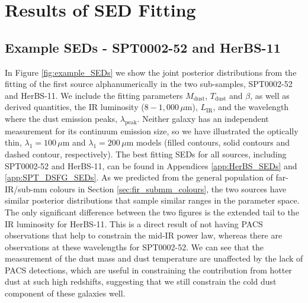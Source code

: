 \section{Results of SED Fitting}

\subsection{Example SEDs - SPT0002-52 and HerBS-11}

In Figure \ref{fig:example_SEDs} we show the joint posterior distributions from the fitting of the first source alphanumerically in the two sub-samples, SPT0002-52 and HerBS-11. We include the fitting parameters $M_{\textrm{dust}}$, $T_{\textrm{dust}}$ and $\beta$, as well as derived quantities, the IR luminosity ($8 - 1,000\,\mu$m), $L_\textrm{IR}$, and the wavelength where the dust emission peaks, $\lambda_\textrm{peak}$. Neither galaxy has an independent measurement for its continuum emission size, so we have illustrated the optically thin, $\lambda_1 = 100\,\mu$m and $\lambda_1 = 200\,\mu$m models (filled contours, solid contours and dashed contour, respectively). The best fitting SEDs for all sources, including SPT0002-52 and HerBS-11, can be found in Appendices \ref{app:HerBS_SEDs} and \ref{app:SPT_DSFG_SEDs}. As we predicted from the general population of far-IR/sub-mm colours in Section \ref{sec:fir_submm_colours}, the two sources have similar posterior distributions that sample similar ranges in the parameter space. The only significant difference between the two figures is the extended tail to the IR luminosity for HerBS-11. This is a direct result of not having PACS observations that help to constrain the mid-IR power law, whereas there are observations at these wavelengths for SPT0002-52. We can see that the measurement of the dust mass and dust temperature are unaffected by the lack of PACS detections, which are useful in constraining the contribution from hotter dust at such high redshifts, suggesting that we still constrain the cold dust component of these galaxies well. 

